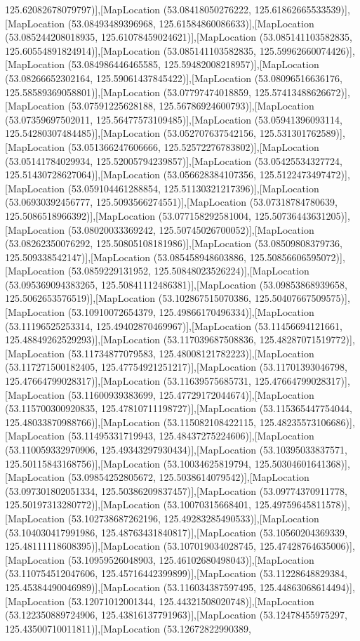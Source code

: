 125.62082678079797)],[MapLocation (53.08418050276222, 125.61862665533539)],[MapLocation (53.08493489396968, 125.61584860086633)],[MapLocation (53.085244208018935, 125.61078459024621)],[MapLocation (53.085141103582835, 125.60554891824914)],[MapLocation (53.085141103582835, 125.59962660074426)],[MapLocation (53.084986446465585, 125.59482008218957)],[MapLocation (53.08266652302164, 125.59061437845422)],[MapLocation (53.08096516636176, 125.58589369058801)],[MapLocation (53.07797474018859, 125.57413488626672)],[MapLocation (53.07591225628188, 125.56786924600793)],[MapLocation (53.07359697502011, 125.56477573109485)],[MapLocation (53.05941396093114, 125.54280307484485)],[MapLocation (53.052707637542156, 125.531301762589)],[MapLocation (53.051366247606666, 125.52572276783802)],[MapLocation (53.05141784029934, 125.52005794239857)],[MapLocation (53.05425534327724, 125.51430728627064)],[MapLocation (53.056628384107356, 125.5122473497472)],[MapLocation (53.059104461288854, 125.51130321217396)],[MapLocation (53.06930392456777, 125.5093566274551)],[MapLocation (53.07318784780639, 125.5086518966392)],[MapLocation (53.077158292581004, 125.50736443631205)],[MapLocation (53.08020033369242, 125.50745026700052)],[MapLocation (53.08262350076292, 125.50805108181986)],[MapLocation (53.08509808379736, 125.509338542147)],[MapLocation (53.085458948603886, 125.50856606595072)],[MapLocation (53.0859229131952, 125.50848023526224)],[MapLocation (53.095369094383265, 125.50841112486381)],[MapLocation (53.09853868939658, 125.5062653576519)],[MapLocation (53.102867515070386, 125.50407667509575)],[MapLocation (53.10910072654379, 125.49866170496334)],[MapLocation (53.11196525253314, 125.49402870469967)],[MapLocation (53.11456694121661, 125.48849262529293)],[MapLocation (53.117039687508836, 125.48287071519772)],[MapLocation (53.11734877079583, 125.48008121782223)],[MapLocation (53.117271500182405, 125.47754921251217)],[MapLocation (53.11701393046798, 125.47664799028317)],[MapLocation (53.11639575685731, 125.47664799028317)],[MapLocation (53.11600939383699, 125.47729172044674)],[MapLocation (53.115700300920835, 125.47810711198727)],[MapLocation (53.115365447754044, 125.48033870988766)],[MapLocation (53.115082108422115, 125.48235573106686)],[MapLocation (53.11495331719943, 125.48437275224606)],[MapLocation (53.110059332970906, 125.49343297930434)],[MapLocation (53.10395033837571, 125.50115843168756)],[MapLocation (53.10034625819794, 125.50304601641368)],[MapLocation (53.09854252805672, 125.5038614079542)],[MapLocation (53.097301802051334, 125.50386209837457)],[MapLocation (53.09774370911778, 125.50197313280772)],[MapLocation (53.10070315668401, 125.49759645811578)],[MapLocation (53.102738687262196, 125.49283285490533)],[MapLocation (53.104030417991986, 125.48763431840817)],[MapLocation (53.10560204369339, 125.48111118608395)],[MapLocation (53.107019034028745, 125.47428764635006)],[MapLocation (53.10959526048903, 125.46102680498043)],[MapLocation (53.110754512047606, 125.45716442399899)],[MapLocation (53.11228648829384, 125.45384490046989)],[MapLocation (53.116034387597495, 125.44863068614494)],[MapLocation (53.12071012001344, 125.44321508020748)],[MapLocation (53.122350889724906, 125.43816137791963)],[MapLocation (53.12478455975297, 125.43500710011811)],[MapLocation (53.12672822990389, 